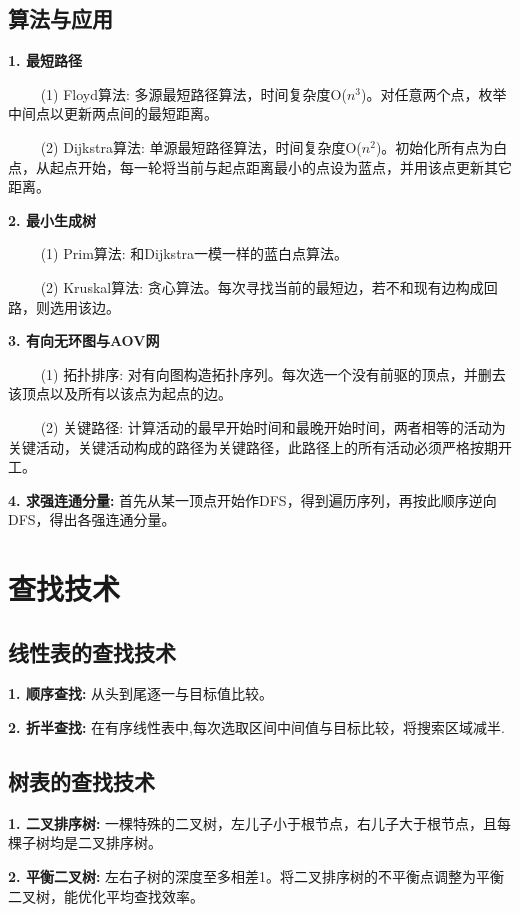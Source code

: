 \subsection{算法与应用}

\textbf{1. 最短路径}

~~~~ (1) Floyd算法: 多源最短路径算法，时间复杂度O($n^3$)。对任意两个点，枚举中间点以更新两点间的最短距离。

~~~~ (2) Dijkstra算法: 单源最短路径算法，时间复杂度O($n^2$)。初始化所有点为白点，从起点开始，每一轮将当前与起点距离最小的点设为蓝点，并用该点更新其它距离。

\textbf{2. 最小生成树}

~~~~ (1) Prim算法: 和Dijkstra一模一样的蓝白点算法。

~~~~ (2) Kruskal算法: 贪心算法。每次寻找当前的最短边，若不和现有边构成回路，则选用该边。

\textbf{3. 有向无环图与AOV网}

~~~~ (1) 拓扑排序: 对有向图构造拓扑序列。每次选一个没有前驱的顶点，并删去该顶点以及所有以该点为起点的边。

~~~~ (2) 关键路径: 计算活动的最早开始时间和最晚开始时间，两者相等的活动为关键活动，关键活动构成的路径为关键路径，此路径上的所有活动必须严格按期开工。

\textbf{4. 求强连通分量: }首先从某一顶点开始作DFS，得到遍历序列，再按此顺序逆向DFS，得出各强连通分量。

\section{查找技术}

\subsection{线性表的查找技术}

\textbf{1. 顺序查找: }从头到尾逐一与目标值比较。

\textbf{2. 折半查找: }在有序线性表中,每次选取区间中间值与目标比较，将搜索区域减半. 

\subsection{树表的查找技术}

\textbf{1. 二叉排序树: }一棵特殊的二叉树，左儿子小于根节点，右儿子大于根节点，且每棵子树均是二叉排序树。

\textbf{2. 平衡二叉树: }左右子树的深度至多相差1。将二叉排序树的不平衡点调整为平衡二叉树，能优化平均查找效率。

